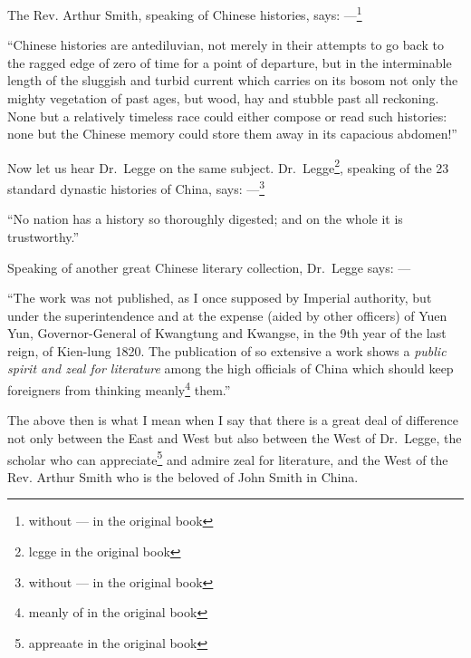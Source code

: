 The Rev. Arthur Smith, speaking of Chinese histories, says: ---\footnote{without --- in the original book}

``Chinese histories are antediluvian, not merely in their attempts to go back to the ragged edge of zero of time for a point of departure, but in the interminable length of the sluggish and turbid current which carries on its bosom not only the mighty vegetation of past ages, but wood, hay and stubble past all reckoning. None but a relatively timeless race could either compose or read such histories: none but the Chinese memory could store them away in its capacious abdomen!''

Now let us hear Dr.~Legge on the same subject.
Dr.~Legge\footnote{lcgge in the original book}, speaking of the 23 standard dynastic histories of China, says: ---\footnote{without --- in the original book}

``No nation has a history so thoroughly digested; and on the whole it is trustworthy.''

Speaking of another great Chinese literary collection, Dr.~Legge says: --- 

``The work was not published, as I once supposed by Imperial authority, but under the superintendence and at the expense (aided by other officers) of Yuen Yun, Governor-General of Kwangtung and Kwangse, in the 9th year of the last reign, of Kien-lung 1820.
The publication of so extensive a work shows a \emph{public spirit and zeal for literature} among the high officials of China which should keep foreigners from thinking meanly\footnote{meanly of in the original book} them.''

The above then is what I mean when I say that there is a great deal of difference not only between the East and West but also between the West of Dr.~Legge, the scholar who can appreciate\footnote{appreaate in the original book} and admire zeal for literature, and the West of the Rev. Arthur Smith who is the beloved of John Smith in China.
